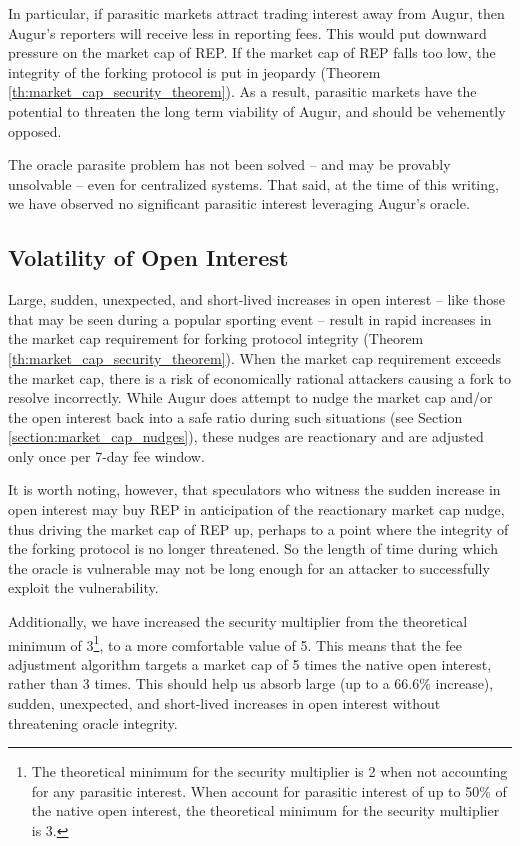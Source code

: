 \documentclass[floatfix,reprint,nofootinbib,amsmath,amssymb,epsfig,pre,floats,letterpaper,groupedaffiliation]{revtex4-1}
\theoremstyle{definition}
\theoremstyle{definition}
\begin{document}
In particular, if parasitic markets attract trading interest away from Augur, then Augur's reporters will receive less in reporting fees. This would put downward pressure on the market cap of REP. If the market cap of REP falls too low, the integrity of the forking protocol is put in jeopardy (Theorem \ref{th:market_cap_security_theorem}). As a result, parasitic markets have the potential to threaten the long term viability of Augur, and should be vehemently opposed.

The oracle parasite problem has not been solved -- and may be provably unsolvable -- even for centralized systems. That said, at the time of this writing, we have observed no significant parasitic interest leveraging Augur's oracle. 

\subsection{Volatility of Open Interest}

Large, sudden, unexpected, and short-lived increases in open interest -- like those that may be seen during a popular sporting event -- result in rapid increases in the market cap requirement for forking protocol integrity (Theorem \ref{th:market_cap_security_theorem}).  When the market cap requirement exceeds the market cap, there is a risk of economically rational attackers causing a fork to resolve incorrectly.  While Augur does attempt to nudge the market cap and/or the open interest back into a safe ratio during such situations (see Section \ref{section:market_cap_nudges}), these nudges are reactionary and are adjusted only once per 7-day fee window.

It is worth noting, however, that speculators who witness the sudden increase in open interest may buy REP in anticipation of the reactionary market cap nudge, thus driving the market cap of REP up, perhaps to a point where the integrity of the forking protocol is no longer threatened.  So the length of time during which the oracle is vulnerable may not be long enough for an attacker to successfully exploit the vulnerability.

Additionally, we have increased the security multiplier from the theoretical minimum of 3\footnote{The theoretical minimum for the security multiplier is 2 when not accounting for any parasitic interest. When account for parasitic interest of up to 50\% of the native open interest, the theoretical minimum for the security multiplier is 3.}, to a more comfortable value of 5. This means that the fee adjustment algorithm targets a market cap of 5 times the native open interest, rather than 3 times. This should help us absorb large (up to a 66.6\% increase), sudden, unexpected, and short-lived increases in open interest without threatening oracle integrity.
\end{document}
